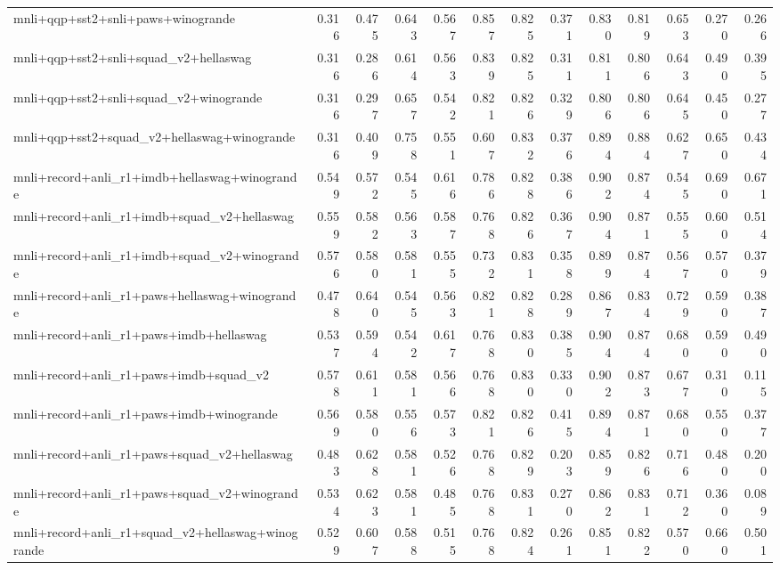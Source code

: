 \begin{table}[t]
\begin{tabular}{lrrrrrrrrrrrr}
    mnli+qqp+sst2+snli+paws+winogrande & 0.316 & 0.475 & 0.643 & 0.567 & 0.857 & 0.825 & 0.371 & 0.830 & 0.819 & 0.653 & 0.270 & 0.266 \\
    mnli+qqp+sst2+snli+squad\_v2+hellaswag & 0.316 & 0.286 & 0.614 & 0.563 & 0.839 & 0.825 & 0.311 & 0.811 & 0.806 & 0.643 & 0.490 & 0.395 \\
    mnli+qqp+sst2+snli+squad\_v2+winogrande & 0.316 & 0.297 & 0.657 & 0.542 & 0.821 & 0.826 & 0.329 & 0.806 & 0.806 & 0.645 & 0.450 & 0.277 \\
    mnli+qqp+sst2+squad\_v2+hellaswag+winogrande & 0.316 & 0.409 & 0.758 & 0.551 & 0.607 & 0.832 & 0.376 & 0.894 & 0.884 & 0.627 & 0.650 & 0.434 \\
    mnli+record+anli\_r1+imdb+hellaswag+winogrande & 0.549 & 0.572 & 0.545 & 0.616 & 0.786 & 0.828 & 0.386 & 0.902 & 0.874 & 0.545 & 0.690 & 0.671 \\
    mnli+record+anli\_r1+imdb+squad\_v2+hellaswag & 0.559 & 0.582 & 0.563 & 0.587 & 0.768 & 0.826 & 0.367 & 0.904 & 0.871 & 0.555 & 0.600 & 0.514 \\
    mnli+record+anli\_r1+imdb+squad\_v2+winogrande & 0.576 & 0.580 & 0.581 & 0.555 & 0.732 & 0.831 & 0.358 & 0.899 & 0.874 & 0.567 & 0.570 & 0.379 \\
    mnli+record+anli\_r1+paws+hellaswag+winogrande & 0.478 & 0.640 & 0.545 & 0.563 & 0.821 & 0.828 & 0.289 & 0.867 & 0.834 & 0.729 & 0.590 & 0.387 \\
    mnli+record+anli\_r1+paws+imdb+hellaswag & 0.537 & 0.594 & 0.542 & 0.617 & 0.768 & 0.830 & 0.385 & 0.904 & 0.874 & 0.680 & 0.590 & 0.490 \\
    mnli+record+anli\_r1+paws+imdb+squad\_v2 & 0.578 & 0.611 & 0.581 & 0.566 & 0.768 & 0.830 & 0.330 & 0.902 & 0.873 & 0.677 & 0.310 & 0.115 \\
    mnli+record+anli\_r1+paws+imdb+winogrande & 0.569 & 0.580 & 0.556 & 0.573 & 0.821 & 0.826 & 0.415 & 0.894 & 0.871 & 0.680 & 0.550 & 0.377 \\
    mnli+record+anli\_r1+paws+squad\_v2+hellaswag & 0.483 & 0.628 & 0.581 & 0.526 & 0.768 & 0.829 & 0.203 & 0.859 & 0.826 & 0.716 & 0.480 & 0.200 \\
    mnli+record+anli\_r1+paws+squad\_v2+winogrande & 0.534 & 0.623 & 0.581 & 0.485 & 0.768 & 0.831 & 0.270 & 0.862 & 0.831 & 0.712 & 0.360 & 0.089 \\
    mnli+record+anli\_r1+squad\_v2+hellaswag+winogrande & 0.529 & 0.607 & 0.588 & 0.515 & 0.768 & 0.824 & 0.261 & 0.851 & 0.822 & 0.570 & 0.660 & 0.501 \\

\end{tabular}
\end{table}

